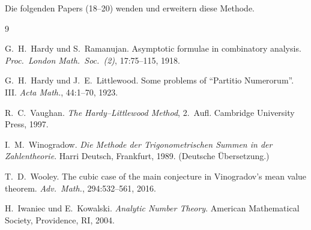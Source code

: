 \documentclass[12pt,a4paper]{amsart}
\theoremstyle{definition}
\begin{document}
Die folgenden Papers (18--20) wenden und erweitern diese Methode.

\begin{thebibliography}{9}

G.~H.~Hardy und S.~Ramanujan.
\newblock Asymptotic formulae in combinatory analysis.
\newblock \emph{Proc.\ London Math.\ Soc.\ (2)}, 17:75--115, 1918.

G.~H.~Hardy und J.~E.~Littlewood.
\newblock Some problems of ``Partitio Numerorum''. III.
\newblock \emph{Acta Math.}, 44:1--70, 1923.

R.~C.~Vaughan.
\newblock \emph{The Hardy--Littlewood Method}, 2.~Aufl.
\newblock Cambridge University Press, 1997.

I.~M.~Winogradow.
\newblock \emph{Die Methode der Trigonometrischen Summen in der Zahlentheorie}.
\newblock Harri Deutsch, Frankfurt, 1989. (Deutsche Übersetzung.)

T.~D.~Wooley.
\newblock The cubic case of the main conjecture in Vinogradov's mean value theorem.
\newblock \emph{Adv.\ Math.}, 294:532--561, 2016.

H.~Iwaniec und E.~Kowalski.
\newblock \emph{Analytic Number Theory}.
\newblock American Mathematical Society, Providence, RI, 2004.

\end{thebibliography}
\end{document}
